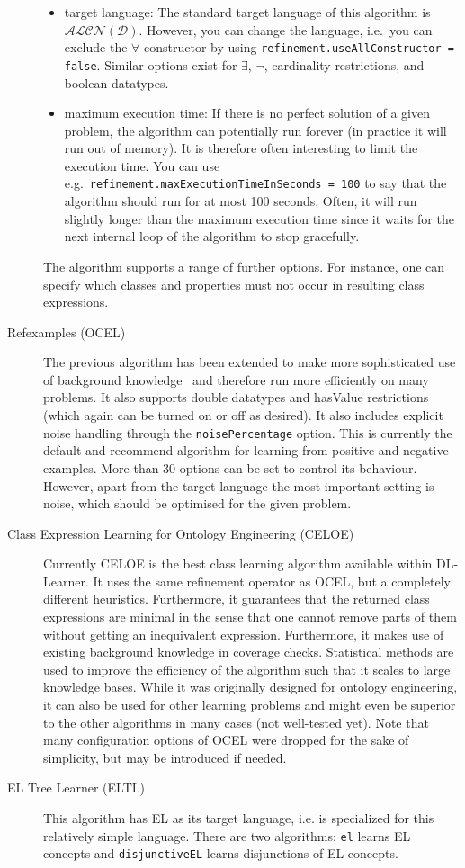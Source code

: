 \documentclass[a4paper,12pt]{scrartcl}
\begin{document}
\begin{description}
 \begin{itemize}
  \item target language: The standard target language of this algorithm is $\mathcal{ALCN(D)}$. However, you can change the language, i.e.~you can exclude the $\forall$ constructor by using \verb|refinement.useAllConstructor = false|. Similar options exist for $\exists$, $\neg$, cardinality restrictions, and boolean datatypes.
  \item maximum execution time: If there is no perfect solution of a given problem, the algorithm can potentially run forever (in practice it will run out of memory). It is therefore often interesting to limit the execution time. You can use e.g.~\verb|refinement.maxExecutionTimeInSeconds = 100| to say that the algorithm should run for at most 100 seconds. Often, it will run slightly longer than the maximum execution time since it waits for the next internal loop of the algorithm to stop gracefully.
 \end{itemize}
  The algorithm supports a range of further options. For instance, one can specify which classes and properties must not occur in resulting class expressions.
 \item[Refexamples (OCEL)] The previous algorithm has been extended to make more sophisticated use of background knowledge~\cite{mlj} and therefore run more efficiently on many problems. It also supports double datatypes and hasValue restrictions (which again can be turned on or off as desired). It also includes explicit noise handling through the \verb|noisePercentage| option. This is currently the default and recommend algorithm for learning from positive and negative examples. More than 30 options can be set to control its behaviour. However, apart from the target language the most important setting is noise, which should be optimised for the given problem.
 \item[Class Expression Learning for Ontology Engineering (CELOE)] Currently CELOE is the best class learning algorithm available within DL-Learner. It uses the same refinement operator as OCEL, but a completely different heuristics. Furthermore, it guarantees that the returned class expressions are minimal in the sense that one cannot remove parts of them without getting an inequivalent expression. Furthermore, it makes use of existing background knowledge in coverage checks. Statistical methods are used to improve the efficiency of the algorithm such that it scales to large knowledge bases. While it was originally designed for ontology engineering, it can also be used for other learning problems and might even be superior to the other algorithms in many cases (not well-tested yet). Note that many configuration options of OCEL were dropped for the sake of simplicity, but may be introduced if needed.
 \item[EL Tree Learner (ELTL)] This algorithm has EL as its target language, i.e. is specialized for this relatively simple language. There are two algorithms: \verb|el| learns EL concepts and \verb|disjunctiveEL| learns disjunctions of EL concepts.
\end{description}
\end{document}

